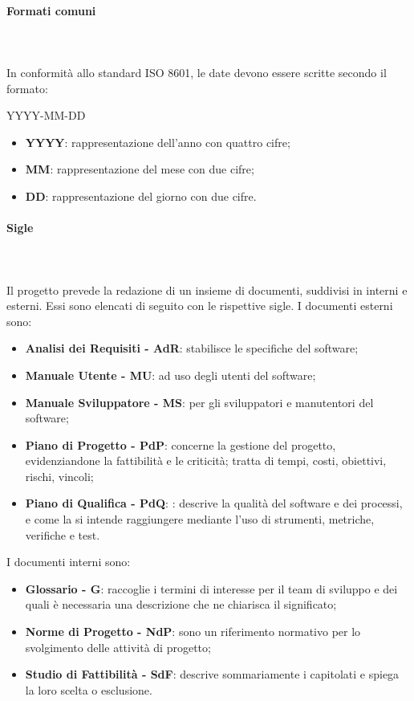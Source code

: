 		\paragraph{Formati comuni} \mbox{}\\ \mbox{}\\
		In conformità allo standard ISO 8601, le date devono essere scritte secondo il formato: \newline \newline
		\centerline{YYYY-MM-DD}
		\begin{itemize}
			\item \textbf{YYYY}: rappresentazione dell'anno con quattro cifre;
			\item\textbf{MM}: rappresentazione del mese con due cifre;
			\item \textbf{DD}: rappresentazione del giorno con due cifre.			
		\end{itemize}
		\paragraph{Sigle} \mbox{}\\ \mbox{}\\
		Il progetto prevede la redazione di un insieme di documenti, suddivisi in interni e esterni. Essi sono elencati di seguito con le rispettive sigle.\newline
		I documenti esterni sono:	
		\begin{itemize}
			\item \textbf{Analisi dei Requisiti - AdR}: stabilisce le specifiche del software;
			\item \textbf{Manuale Utente - MU}: ad uso degli utenti del software;
			\item \textbf{Manuale Sviluppatore - MS}: per gli sviluppatori e manutentori del software;
			\item \textbf{Piano di Progetto - PdP}:  concerne la gestione del progetto, evidenziandone la fattibilità e le criticità; tratta di tempi, costi, obiettivi, rischi, vincoli;
			\item \textbf{Piano di Qualifica - PdQ}: : descrive la qualità del software e dei processi, e come la si intende raggiungere mediante l'uso di strumenti, metriche, verifiche e test.
		\end{itemize}
		I documenti interni sono:
		\begin{itemize}
			\item \textbf{Glossario - G}: raccoglie i termini di interesse per il team di sviluppo e dei quali è necessaria una descrizione che ne chiarisca il significato;
			\item \textbf{Norme di Progetto - NdP}: sono un riferimento normativo per lo svolgimento delle attività di progetto;
			\item \textbf{Studio di Fattibilità - SdF}: descrive sommariamente i capitolati e spiega la loro scelta o esclusione.
		\end{itemize}

